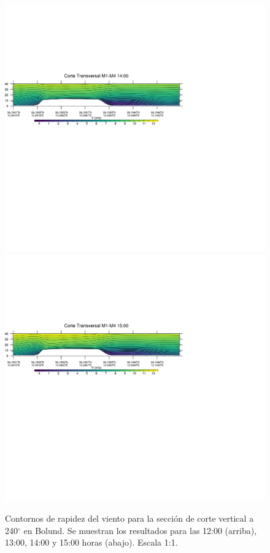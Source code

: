 \begin{figure}[H]
	\includegraphics[width=0.90\linewidth,trim={0mm 202.0mm 111mm 106mm},clip]{Imagenes/06/bol/1400rot}\\%
	\includegraphics[width=0.90\linewidth,trim={0mm 180.0mm 111mm 106mm},clip]{Imagenes/06/bol/1500rot}%
	\caption{Contornos de rapidez del viento para la sección de corte vertical a 240$^\circ$ en Bolund. Se muestran los resultados para las 12:00 (arriba), 13:00, 14:00 y 15:00 horas (abajo). Escala 1:1.}
	\label{fig:06_bol_cross}
\end{figure}

